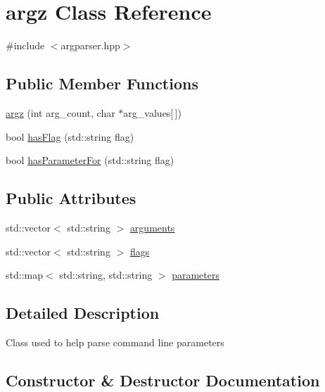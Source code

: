 \hypertarget{classargz}{}\section{argz Class Reference}
\label{classargz}


{\ttfamily \#include $<$argparser.\+hpp$>$}

\subsection*{Public Member Functions}
\begin{DoxyCompactItemize}
\item 
\hyperlink{classargz_a944cd1bfad40f39e4dcd781f48d8a903}{argz} (int arg\+\_\+count, char $\ast$arg\+\_\+values\mbox{[}$\,$\mbox{]})
\item 
bool \hyperlink{classargz_ab9c76400c455fd77c84b063e21313826}{has\+Flag} (std\+::string flag)
\item 
bool \hyperlink{classargz_a19eb5bdb61687c369cc6ca1df3e9f4f0}{has\+Parameter\+For} (std\+::string flag)
\end{DoxyCompactItemize}
\subsection*{Public Attributes}
\begin{DoxyCompactItemize}
\item 
std\+::vector$<$ std\+::string $>$ \hyperlink{classargz_a5368a7c00a82a6cab03ac6bf61f91d8a}{arguments}
\item 
std\+::vector$<$ std\+::string $>$ \hyperlink{classargz_a97f74aab2350165bd2e2b00e840f8be0}{flags}
\item 
std\+::map$<$ std\+::string, std\+::string $>$ \hyperlink{classargz_ac89e44a2a4910e94e28d06d12c6a95f7}{parameters}
\end{DoxyCompactItemize}


\subsection{Detailed Description}
Class used to help parse command line parameters 

\subsection{Constructor \& Destructor Documentation}
